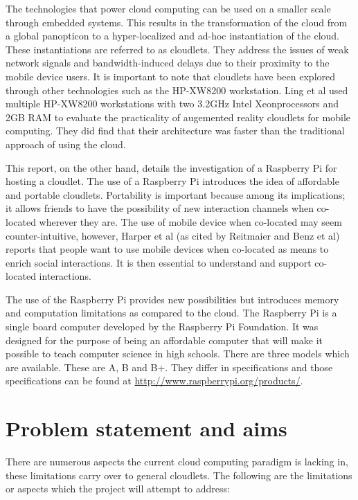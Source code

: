 The technologies that power cloud computing can be used on a smaller scale through embedded systems. This results in the transformation of the cloud from a global panopticon to a hyper-localized and ad-hoc instantiation of the cloud. These instantiations are referred to as cloudlets. They address the issues of weak network signals and bandwidth-induced delays due to their proximity to the mobile device users. It is important to note that cloudlets have been explored through other technologies such as the HP-XW8200 workstation. Ling et al\cite{ling2011ar} used multiple HP-XW8200 workstations with two 3.2GHz Intel Xeonprocessors and 2GB RAM to evaluate the practicality of augemented reality cloudlets for mobile computing. They did find that their architecture was faster than the traditional approach of using the cloud.\newline

This report, on the other hand, details the investigation of a Raspberry Pi for hosting a cloudlet. The use of a Raspberry Pi introduces the idea of affordable and portable cloudlets. Portability is important because among its implications; it allows friends to have the possibility of new interaction channels when co-located wherever they are. The use of mobile device when co-located may seem counter-intuitive, however, Harper et al\cite{RefWorks:15} (as cited by Reitmaier and Benz et al\cite[p. 381]{reitmaier2013designing}) reports that people want to use mobile devices when co-located as means to enrich social interactions. It is then essential to understand and support co-located interactions.\newline

The use of the Raspberry Pi provides new possibilities but introduces memory and computation limitations as compared to the cloud. The Raspberry Pi is a single board computer developed by the Raspberry Pi Foundation. It was designed for the purpose of being an affordable computer that will make it possible to teach computer science in high schools. There are three models which are available. These are A, B and B+. They differ in specifications and those specifications can be found at \url{ http://www.raspberrypi.org/products/}.

\section {Problem statement and aims}

There are numerous aspects the current cloud computing paradigm is lacking in, these limitations carry over to general cloudlets. The following are the limitations or aspects which the project will attempt to address:

